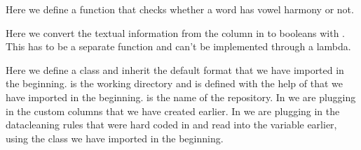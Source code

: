 \documentclass[letterpaper,10pt,english]{sphinxmanual}
\begin{document}
\sphinxAtStartPar
Here we define a function that checks whether a word has vowel harmony or not.

\begin{sphinxVerbatim}[commandchars=\\\{\}]
  
           
\end{sphinxVerbatim}

\sphinxAtStartPar
Here we convert the textual information from the column  in
 to booleans with .
This has to be a separate function and can’t be implemented through a lambda.

\begin{sphinxVerbatim}[commandchars=\\\{\}]
 
      
      
      
       
                          
\end{sphinxVerbatim}

\sphinxAtStartPar
Here we define a class and inherit the default format  that we
have imported in the beginning.  is the working directory and is
defined with the help of  that we have imported in the beginning.
 is the name of the repository. In  we are plugging in
the custom columns that we have created earlier. In  we are
plugging in the data\sphinxhyphen{}cleaning rules that were hard coded in
 and read into the  variable earlier, using the
 class we have imported in the beginning.
\end{document}

